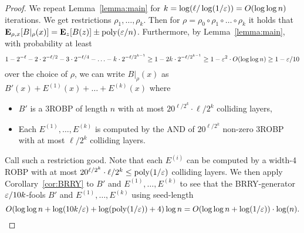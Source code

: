 {\begin{proof}
We repeat Lemma~\ref{lemma:main} for $k = \log(\ell/\log(1/\varepsilon)) = O(\log \log n)$ iterations.
We get restrictions $\rho_1, \ldots, \rho_k$.
Then for $\rho = \rho_0 \circ \rho_1 \circ  \ldots \circ \rho_k$ it holds that $\mathop{\bf E\/}_{\rho,x}[B|_{\rho}(x)] = \mathop{\bf E\/}_{z}[B(z)] \pm {\mathrm{poly}}(\varepsilon/n)$.
Furthermore, by Lemma~\ref{lemma:main}, with probability at least 
$$
1-2^{-\ell} - 2\cdot 2^{-\ell/2} - 3\cdot 2^{-\ell/4} - \ldots  - k\cdot 2^{-\ell/2^{k-1}} \ge 1-2k\cdot 2^{-\ell/2^{k-1}} \ge 1-\varepsilon^2 \cdot O(\log \log n) \ge 1-\varepsilon/10
$$
over the choice of $\rho$, we can write
$B|_{\rho}(x)$ as $B'(x) + E^{(1)}(x) + \ldots + E^{(k)}(x)$  where 
\begin{itemize}
	\item $B'$ is a 3ROBP of length $n$ with at most $20^{\ell/2^{k}}\cdot \ell/2^{k}$ colliding layers, 
	\item Each $E^{(1)}, \ldots, E^{(k)}$ is computed by the AND of $20^{\ell/2^{k}}$ non-zero 3ROBP with at most $\ell/2^{k}$
	 colliding layers. 
\end{itemize}
Call such a restriction {\sf good}.
Note that each $E^{(i)}$ can be computed by a width-4 ROBP with at most $20^{\ell/2^{k}} \cdot \ell/2^{k} \le {\mathrm{poly}}(1/\varepsilon)$ colliding layers.
We then apply Corollary~\ref{cor:BRRY} to $B'$ and $E^{(1)}, \ldots, E^{(k)}$ to see that the BRRY-generator $\varepsilon/10k$-fools $B'$ and $E^{(1)}, \ldots, E^{(k)}$ using seed-length 
$$O(\log \log n + \log(10k/\varepsilon) + \log({\mathrm{poly}}(1/\varepsilon)) + 4) \log n = O(\log\log n + \log(1/\varepsilon))\cdot \log(n).$$


\end{proof}}
